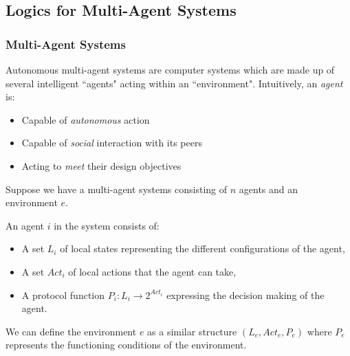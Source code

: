 \documentclass[11pt]{article}
\newenvironment{definition}[1][Definition]{\begin{trivlist}
\item[\hskip \labelsep {\bfseries #1}]}{\end{trivlist}}
\begin{document}
\subsection{Logics for Multi-Agent Systems}

\subsubsection{Multi-Agent Systems}

Autonomous multi-agent systems are computer systems which are made up of several intelligent ``agents" acting within an ``environment". 
Intuitively, an \textit{agent} is: 
\begin{itemize}
\item Capable of \textit{autonomous} action 
\item Capable of \textit{social} interaction with its peers
\item Acting to \textit{meet} their design objectives 
\end{itemize}
 
Suppose we have a multi-agent systems consisting of $n$ agents and an environment $e$.
\begin{definition} 
An agent $i$ in the system consists of: 
\begin{itemize}
\item A set $L_i$ of local states representing the different configurations of the agent,
\item A set $Act_i$ of local actions that the agent can take,
\item A protocol function $P_i : L_i \rightarrow 2^{Act_i} $ expressing the decision making of the agent.
\end{itemize} 
\end{definition}

We can define the environment $e$ as a similar structure $(L_e, Act_e, P_e)$ where $P_e$ represents the functioning conditions of the environment. 
\end{document}
